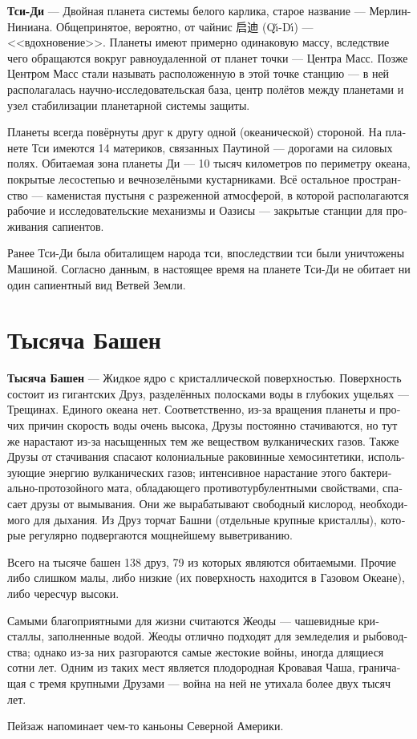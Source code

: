 \documentclass[a4paper,12pt,fleqn]{book}\usepackage{polyglossia}\setdefaultlanguage[babelshorthands=true]{russian}\setotherlanguage{english}\defaultfontfeatures{Ligatures=TeX,Mapping=tex-text}\usepackage{xcolor}\newcommand{\ml}[3]{#2}
\newcommand{\theterm}[3]{\textbf{\hypertarget{#1}{#2}} --- #3}
\begin{document}
\theterm{qi-di}
{Тси-Ди}
{Двойная планета системы белого карлика, старое название --- Мерлин-Ниниана.
Общепринятое, вероятно, от чайнис 启迪 (Q\v{\i}-D\'{\i}) --- <<вдохновение>>.
Планеты имеют примерно одинаковую массу, вследствие чего обращаются вокруг равноудаленной от планет точки --- Центра Масс.
Позже Центром Масс стали называть расположенную в этой точке станцию --- в ней располагалась научно-исследовательская база, центр полётов между планетами и узел стабилизации планетарной системы защиты.

Планеты всегда повёрнуты друг к другу одной (океанической) стороной.
На планете Тси имеются 14 материков, связанных Паутиной --- дорогами на силовых полях.
Обитаемая зона планеты Ди --- 10 тысяч километров по периметру океана, покрытые лесостепью и вечнозелёными кустарниками.
Всё остальное пространство --- каменистая пустыня с разреженной атмосферой, в которой располагаются рабочие и исследовательские механизмы и Оазисы --- закрытые станции для проживания сапиентов.

Ранее Тси-Ди была обиталищем народа тси, впоследствии тси были уничтожены Машиной.
Согласно данным, в настоящее время на планете Тси-Ди не обитает ни один сапиентный вид Ветвей Земли.}

\section{Тысяча Башен}

\theterm{thousand-towers}
{Тысяча Башен}
{Жидкое ядро с кристаллической поверхностью.
Поверхность состоит из гигантских Друз, разделённых полосками воды в глубоких ущельях --- Трещинах.
Единого океана нет.
Соответственно, из-за вращения планеты и прочих причин скорость воды очень высока, Друзы постоянно стачиваются, но тут же нарастают из-за насыщенных тем же веществом вулканических газов.
Также Друзы от стачивания спасают колониальные раковинные хемосинтетики, использующие энергию вулканических газов;
интенсивное нарастание этого бактериально-протозойного мата, обладающего противотурбулентными свойствами, спасает друзы от вымывания.
Они же вырабатывают свободный кислород, необходимого для дыхания.
Из Друз торчат Башни (отдельные крупные кристаллы), которые регулярно подвергаются мощнейшему выветриванию.

Всего на тысяче башен 138 друз, 79 из которых являются обитаемыми.
Прочие либо слишком малы, либо низкие (их поверхность находится в Газовом Океане), либо чересчур высоки.

Самыми благоприятными для жизни считаются Жеоды --- чашевидные кристаллы, заполненные водой.
Жеоды отлично подходят для земледелия и рыбоводства;
однако из-за них разгораются самые жестокие войны, иногда длящиеся сотни лет.
Одним из таких мест является плодородная Кровавая Чаша, граничащая с тремя крупными Друзами --- война на ней не утихала более двух тысяч лет.

Пейзаж напоминает чем-то каньоны Северной Америки.}
\end{document}
